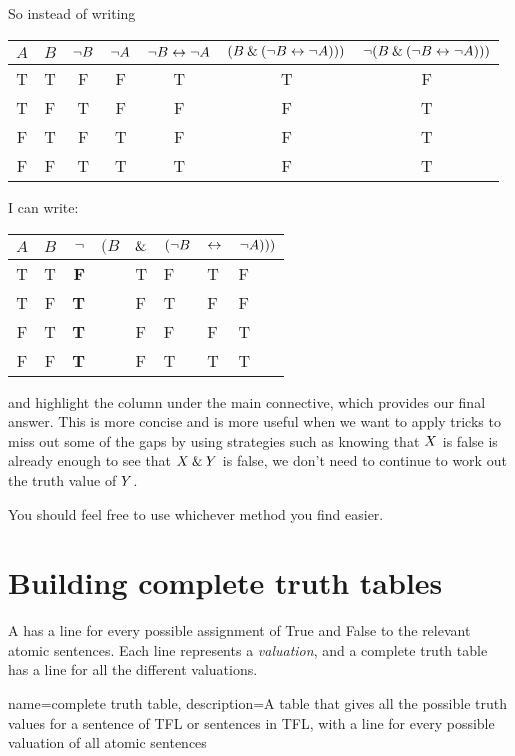 So instead of writing
\begin{center}
\begin{tabular}{cc|cccc|c}
$A$&$B$&$\neg B$&$\neg A$&$\neg B\leftrightarrow \neg A$&$(B\mathbin{\&}(\neg B\leftrightarrow \neg A)))$&$\neg (B\mathbin{\&}(\neg B\leftrightarrow \neg A)))$\\\hline
T&T&F&F&T&T&F\\
T&F&T&F&F&F&T\\
F&T&F&T&F&F&T\\
F&F&T&T&T&F&T
\end{tabular}
\end{center}
I can write:\begin{center}
\begin{tabular}{cc|deeeef}
$A$&$B$&\textbf{$\neg$}&$(B$&$\mathbin{\&}$&$(\neg B$&$\leftrightarrow$&$ \neg A)))$\\\hline
T&T&\textbf{F}&&T&F&T&F\\
T&F&\textbf{T}&&F&T&F&F\\
F&T&\textbf{T}&&F&F&F&T\\
F&F&\textbf{T}&&F&T&T&T
\end{tabular}
\end{center}and highlight the column under the main connective, which provides our final answer. This is more concise and is more useful when we want to apply tricks to miss out some of the gaps by using strategies such as knowing that $X$ is false is already enough to see that $X\mathbin{\&}Y$ is false, we don't need to continue to work out the truth value of $Y$.

You should feel free to use whichever method you find easier.

\section{Building complete truth tables}
A  has a line for every possible assignment of True and False to the relevant atomic sentences. Each line represents a \emph{valuation}, and a complete truth table has a line for all the different valuations.

{
name=complete truth table,
description={A table that gives all the possible \glspl{truth value} for a \gls{sentence of TFL} or sentences in TFL, with a line for every possible \gls{valuation} of all atomic sentences}
}

